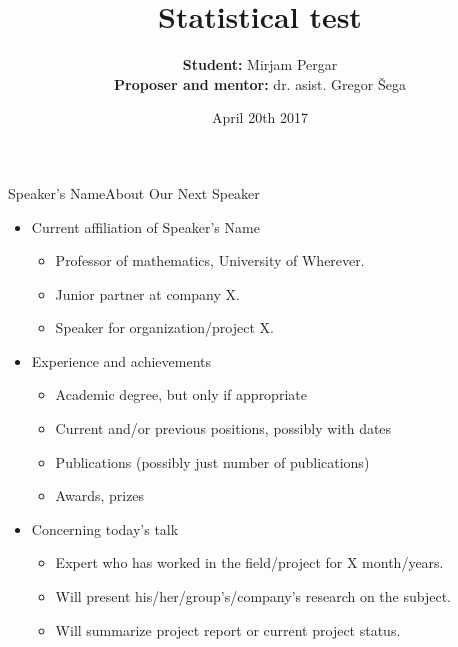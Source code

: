 \documentclass{beamer}
\title[Statistical test]
{Statistical test}
\author[Mirjam Pergar]
{\textbf{Student:}  Mirjam Pergar\\
\textbf{Proposer and mentor:} dr. asist. Gregor Šega
}
\institute[Fakuleta za matematiko in fiziko]
\date[April 20th 2017] %
{April 20th 2017}
\begin{document}
\begin{frame}{Speaker's Name}{About Our Next Speaker}

  \begin{itemize}
  \item
    Current affiliation of Speaker's Name

    \begin{itemize}
    \item
      Professor of mathematics, University of Wherever.
    \item
      Junior partner at company X.
    \item
      Speaker for organization/project X.
    \end{itemize}
  \item
    Experience and achievements

    \begin{itemize}
    \item
      Academic degree, but only if appropriate
    \item
      Current and/or previous positions, possibly with dates
    \item
      Publications (possibly just number of publications)
    \item
      Awards, prizes
    \end{itemize}
  \item
    Concerning today's talk

    \begin{itemize}
    \item
      Expert who has worked in the field/project for X month/years.
    \item
      Will present his/her/group's/company's research on the subject.
    \item
      Will summarize project report or current project status.
    \end{itemize}
  \end{itemize}  
\end{frame}
\end{document}
